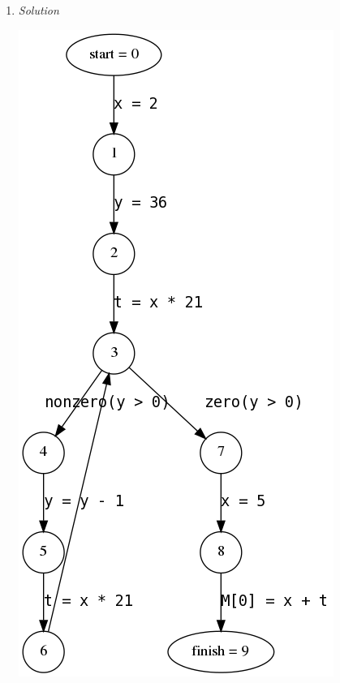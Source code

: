 \documentclass[a4paper]{article}
\begin{document}
\begin{enumerate}
  \item \em{}Solution\em

  \vspace{5mm}

  \includegraphics[scale=0.3]{1-1a.png}
  \hspace{2cm}

\end{enumerate}
\end{document}
